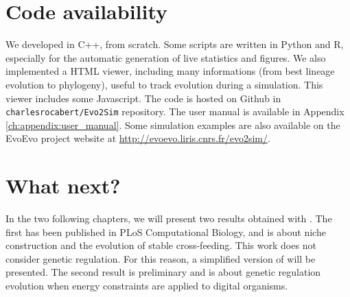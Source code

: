 
\section{Code availability}
\label{sec:part2:methodology:code_availability}

We developed {\EvoEvoSim} in C++, from scratch. Some scripts are written in Python and R, especially for the automatic generation of live statistics and figures. We also implemented a HTML viewer, including many informations (from best lineage evolution to phylogeny), useful to track evolution during a simulation. This viewer includes some Javascript. The code is hosted on Github in \texttt{charlesrocabert/Evo2Sim} repository. The {\EvoEvoSim} user manual is available in Appendix \ref{ch:appendix:user_manual}. Some simulation examples are also available on the EvoEvo project website at \href{http://evoevo.liris.cnrs.fr/evo2sim/}{http://evoevo.liris.cnrs.fr/evo2sim/}.


\section{What next?}
\label{sec:part2:methodology:what_next}

In the two following chapters, we will present two results obtained with {\EvoEvoSim}. The first has been published in PLoS Computational Biology, and is about niche construction and the evolution of stable cross-feeding. This work does not consider genetic regulation. For this reason, a simplified version of {\EvoEvoSim} will be presented. The second result is preliminary and is about genetic regulation evolution when energy constraints are applied to digital organisms.

